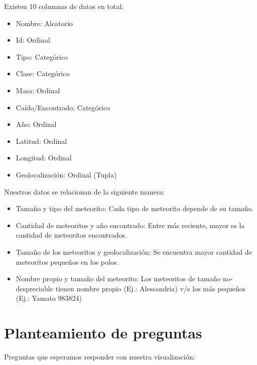 \documentclass[letterpaper,10pt]{article}
\begin{document}
	Existen 10 columnas de datos en total:

	\begin{itemize}
		\item Nombre: Aleatorio
		\item Id: Ordinal
		\item Tipo: Categórico
		\item Clase: Categórico
		\item Masa: Ordinal

		\item Caído/Encontrado: Categórico
		\item Año: Ordinal
		\item Latitud: Ordinal
		\item Longitud: Ordinal
		\item Geolocalización: Ordinal (Tupla)
	\end{itemize}

	Nuestros datos se relacionan de la siguiente manera:

	\begin{itemize}
		\item Tamaño y tipo del meteorito: Cada tipo de meteorito depende de su tamaño.
		\item Cantidad de meteoritos y año encontrado: Entre más reciente, mayor es la cantidad de meteoritos encontrados.
		\item Tamaño de los meteoritos y geolocalización: Se encuentra mayor cantidad de meteoritos pequeños en los polos.
		\item Nombre propio y tamaño del meteorito: Los meteoritos de tamaño no-despreciable tienen nombre propio (Ej.: Alessandria) v/s los más pequeños (Ej.: Yamato 983824)
	\end{itemize}

	\newpage

	\section{Planteamiento de preguntas}

	Preguntas que esperamos responder con nuestra visualización:
\end{document}
